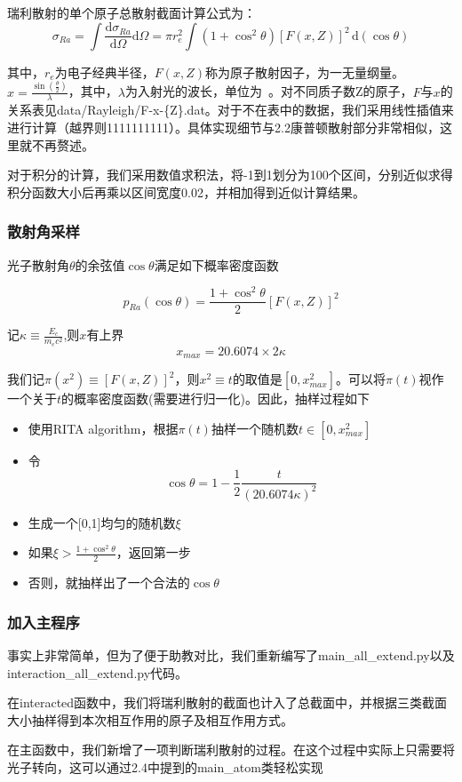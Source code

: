 \documentclass[12pt,a4paper]{article}%
\begin{document}
        瑞利散射的单个原子总散射截面计算公式\cite{penelope2006workshop}为：
        $$\sigma_{Ra} = \int \frac{\mathrm d\sigma_{Ra}}{\mathrm d\Omega} \mathrm d\Omega = \pi r_e^2 \int \left(1 + \cos^2 \theta\right) \left[F(x, Z)\right]^2 \, \mathrm  d(\cos \theta)$$

        其中，$r_e$为电子经典半径，$F(x, Z)$称为原子散射因子，为一无量纲量。$x = \frac{\sin\left(\frac{\theta}{2}\right)}{\lambda}$，其中，$\lambda$为入射光的波长，单位为\, \text{\AA}。对不同质子数Z的原子，$F$与$x$的关系表见data/Rayleigh/F-x-\{Z\}.dat\cite{hubbell1975atomic}。对于不在表中的数据，我们采用线性插值来进行计算（越界则1111111111）。具体实现细节与2.2康普顿散射部分非常相似，这里就不再赘述。
        
        对于积分的计算，我们采用数值求积法，将-1到1划分为100个区间，分别近似求得积分函数大小后再乘以区间宽度0.02，并相加得到近似计算结果。

        \subsubsection{散射角采样}
        光子散射角$\theta$的余弦值$\cos\theta$满足如下概率密度函数\par
        $$
        p_{Ra}(\cos\theta) = \frac{1+\cos^2\theta}{2}[F(x,Z)]^2
        $$\par
        记$\kappa \equiv \frac{E_c}{m_ec^2}$,则$x$有上界
        $$
        x_{max} = 20.6074 \times 2\kappa
        $$\par
        我们记$\pi(x^2) \equiv [F(x,Z)]^2$，则$x^2\equiv t$的取值是$[0,x_{max}^2]$。可以将$\pi(t)$视作一个关于$t$的概率密度函数(需要进行归一化)。因此，抽样过程如下\par
        \begin{itemize}
            \item 使用RITA algorithm，根据$\pi(t)$抽样一个随机数$t\in[0, x_{max}^2]$

            \item 令
            $$
            \cos\theta = 1 - \frac{1}{2}\frac{t}{(20.6074\kappa)^2}
            $$
            \item 生成一个[0,1]均匀的随机数$\xi$
            \item 如果$\xi > \frac{1+\cos^2\theta}{2}$，返回第一步
            \item 否则，就抽样出了一个合法的$\cos\theta$
        \end{itemize}

        \subsubsection{加入主程序}
        事实上非常简单，但为了便于助教对比，我们重新编写了main\_all\_extend.py以及interaction\_all\_extend.py代码。\par
        在interacted函数中，我们将瑞利散射的截面也计入了总截面中，并根据三类截面大小抽样得到本次相互作用的原子及相互作用方式。\par
        在主函数中，我们新增了一项判断瑞利散射的过程。在这个过程中实际上只需要将光子转向，这可以通过2.4中提到的main\_atom类轻松实现
\end{document}
